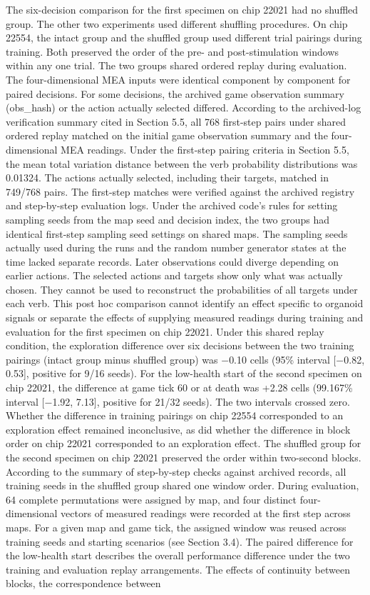 \documentclass{article}
\begin{document}
The six-decision comparison for the first specimen on chip 22021 had no shuffled group. The other two experiments used different shuffling procedures. On chip 22554, the intact group and the shuffled group used different trial pairings during training. Both preserved the order of the pre- and post-stimulation windows within any one trial. The two groups shared ordered replay during evaluation. The four-dimensional MEA inputs were identical component by component for paired decisions. For some decisions, the archived game observation summary (obs\_\allowbreak{}hash) or the action actually selected differed. According to the archived-log verification summary cited in Section 5.5, all 768 first-step pairs under shared ordered replay matched on the initial game observation summary and the four-dimensional MEA readings. Under the first-step pairing criteria in Section 5.5, the mean total variation distance between the verb probability distributions was 0.01324. The actions actually selected, including their targets, matched in 749/768 pairs. The first-step matches were verified against the archived registry and step-by-step evaluation logs. Under the archived code's rules for setting sampling seeds from the map seed and decision index, the two groups had identical first-step sampling seed settings on shared maps. The sampling seeds actually used during the runs and the random number generator states at the time lacked separate records. Later observations could diverge depending on earlier actions. The selected actions and targets show only what was actually chosen. They cannot be used to reconstruct the probabilities of all targets under each verb. This post hoc comparison cannot identify an effect specific to organoid signals or separate the effects of supplying measured readings during training and evaluation for the first specimen on chip 22021. Under this shared replay condition, the exploration difference over six decisions between the two training pairings (intact group minus shuffled group) was \ensuremath{-}0.10 cells (95\% interval [\ensuremath{-}0.82, 0.53], positive for 9/16 seeds). For the low-health start of the second specimen on chip 22021, the difference at game tick 60 or at death was +2.28 cells (99.167\% interval [\ensuremath{-}1.92, 7.13], positive for 21/32 seeds). The two intervals crossed zero. Whether the difference in training pairings on chip 22554 corresponded to an exploration effect remained inconclusive, as did whether the difference in block order on chip 22021 corresponded to an exploration effect. The shuffled group for the second specimen on chip 22021 preserved the order within two-second blocks. According to the summary of step-by-step checks against archived records, all training seeds in the shuffled group shared one window order. During evaluation, 64 complete permutations were assigned by map, and four distinct four-dimensional vectors of measured readings were recorded at the first step across maps. For a given map and game tick, the assigned window was reused across training seeds and starting scenarios (see Section 3.4). The paired difference for the low-health start describes the overall performance difference under the two training and evaluation replay arrangements. The effects of continuity between blocks, the correspondence between 
\end{document}
